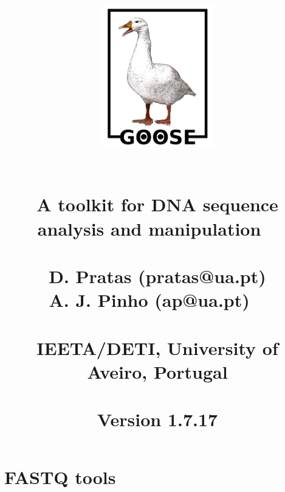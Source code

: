\documentclass[11pt,journal,compsoc]{report}[1]
\begin{document}

\title{
%
\begin{figure}[h!]
\centerline{\includegraphics[width=5cm]{../imgs/logo.pdf}}
\label{logo}
\end{figure}
~\\
\textbf{A toolkit for DNA sequence\\ analysis and manipulation}
~\\~\\
\large
D. Pratas (pratas@ua.pt)\\
A. J. Pinho (ap@ua.pt)
~\\~\\
\small
IEETA/DETI, University of Aveiro, Portugal\\
~\\
Version 1.7.17
}
\date{}
\maketitle

\tableofcontents

\chapter*{FASTQ tools}
\end{document}
